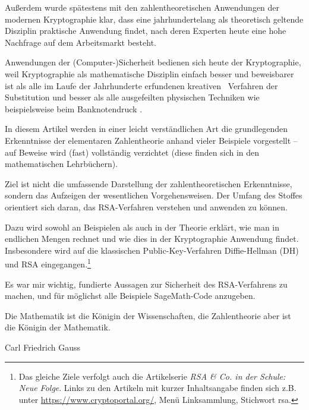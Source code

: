 \begin{refsegment}
Außerdem wurde spätestens mit den zahlentheoretischen Anwendungen der
modernen Kryptographie klar, dass eine jahrhundertelang als theoretisch
geltende Disziplin praktische Anwendung findet, nach deren Experten heute
eine hohe Nachfrage auf dem Arbeitsmarkt besteht.

Anwendungen der (Computer-)Sicherheit bedienen sich heute der Kryptographie,
weil Kryptographie als mathematische Disziplin einfach besser und
beweisbarer ist als alle im Laufe der Jahrhunderte erfundenen \glqq kreativen\grqq~
Verfahren der Substitution und besser als alle ausgefeilten physischen
Techniken wie beispielsweise beim Banknotendruck \cite[S. 4]{Beutelspacher1996}.

In diesem Artikel werden in einer leicht verständlichen Art die
grundlegenden Erkenntnisse der elementaren Zahlentheorie anhand vieler
Beispiele vorgestellt -- auf Beweise wird (fast) vollständig verzichtet
(diese finden sich in den mathematischen Lehrbüchern).

Ziel ist nicht die umfassende Darstellung der zahlentheoretischen Erkenntnisse,
sondern das Aufzeigen der wesentlichen Vorgehensweisen. Der Umfang des Stoffes
orientiert sich daran, das RSA-Verfahren verstehen und anwenden
zu können.

Dazu wird sowohl an Beispielen als auch in der Theorie erklärt, wie man in
endlichen Mengen rechnet und wie dies in der Kryptographie Anwendung findet.
Insbesondere wird auf die klassischen Public-Key-Verfahren Diffie-Hellman
 (DH) und RSA eingegangen.\footnote{%
  Das gleiche Ziele verfolgt auch die Artikelserie
  {\em RSA \& Co. in der Schule: Neue Folge}.
  Links zu den Artikeln mit kurzer Inhaltsangabe finden sich z.B. unter
  \url{https://www.cryptoportal.org/}, Menü \glqq Linksammlung\grqq,
  Stichwort \glqq rsa\grqq.
}

Es war mir wichtig, fundierte Aussagen zur Sicherheit des RSA-Verfahrens zu
machen, und für möglichst alle Beispiele SageMath-Code anzugeben.


\newpage
\begin{ctsquote}
Die Mathematik ist die Königin der Wissenschaften, die Zahlentheorie aber
ist die Königin der Mathematik.
\caption{Carl Friedrich Gauss}
\end{ctsquote}


\end{refsegment}

